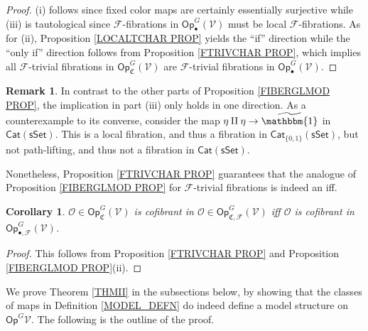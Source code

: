 \documentclass[a4paper,10pt
,draft
]{article}%
\numberwithin{equation}{section}
\numberwithin{figure}{section}
\newtheorem{corollary}[equation]{Corollary}%
\theoremstyle{definition} %
\newtheorem{remark}[equation]{Remark}%
\newcommand{\Op}{\mathsf{Op}}%
\newcommand{\F}{\ensuremath{\mathcal F}}
\newcommand{\V}{\ensuremath{\mathcal V}}
\renewcommand{\O}{\ensuremath{\mathcal O}}
\newcommand{\1}{\ensuremath{\mathbbm 1}}%
\begin{document}
\begin{proof}
	(i) follows since fixed color maps are certainly essentially surjective while (iii) is tautological since 
	$\F$-fibrations in $\mathsf{Op}_{\bullet}^G(\V)$ must be local $\F$-fibrations.
	As for (ii), 
	Proposition \ref{LOCALTCHAR PROP} yields the ``if'' direction
	while the ``only if'' direction follows from 
	Proposition \ref{FTRIVCHAR PROP}, 
	which implies all $\F$-trivial fibrations in $\mathsf{Op}_{\mathfrak{C}}^G(\V)$
	are $\F$-trivial fibrations in 
	$\mathsf{Op}_{\bullet}^G(\V)$.
\end{proof}



\begin{remark}
In contrast to the other parts of 
Proposition \ref{FIBERGLMOD PROP},
the implication in part (iii) 
only holds in one direction. 
As a counterexample to its converse, 
consider the map $\eta \amalg \eta \to \widetilde{\mathbbm{1}}$
in $\mathsf{Cat}(\mathsf{sSet})$. This is a local fibration, 
and thus a fibration in $\mathsf{Cat}_{\{0,1\}}(\mathsf{sSet})$,
but not path-lifting, and thus not a fibration in $\mathsf{Cat}(\mathsf{sSet})$.

Nonetheless, Proposition \ref{FTRIVCHAR PROP}
guarantees that the analogue of Proposition \ref{FIBERGLMOD PROP}
for $\F$-trivial fibrations is indeed an iff.
\end{remark}



\begin{corollary}
      $\O \in \Op^G_{\mathfrak C}(\V)$ is cofibrant in
      $\O \in \Op^G_{\mathfrak C,\mathcal{F}}(\V)$
      iff $\O$ is cofibrant in $\Op^G_{\bullet,\F}(\V)$.
\end{corollary}

\begin{proof}
      This follows from Proposition \ref{FTRIVCHAR PROP} and Proposition \ref{FIBERGLMOD PROP}(ii).
\end{proof}


We prove Theorem \ref{THMII} in the subsections below,
by showing that the classes of maps in Definition \ref{MODEL_DEFN}
do indeed define a model structure on $\mathsf{Op}^G{\V}$.
The following is the outline of the proof.
\end{document}
